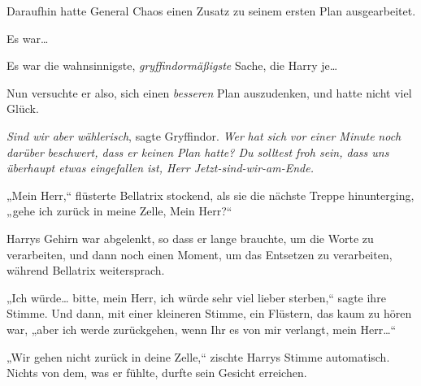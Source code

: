 Daraufhin hatte General Chaos einen Zusatz zu seinem ersten Plan ausgearbeitet.

Es war…

Es war die wahnsinnigste, \emph{gryffindormäßigste} Sache, die Harry je…

Nun versuchte er also, sich einen \emph{besseren} Plan auszudenken, und hatte nicht viel Glück.

\emph{Sind wir aber wählerisch}, sagte Gryffindor. \emph{Wer} \emph{hat sich} \emph{vor einer Minute} \emph{noch} \emph{darüber} \emph{beschwert, dass er keinen Plan hatte? Du solltest froh sein, dass uns überhaupt etwas eingefallen ist, Herr Jetzt-sind-wir-am-Ende.}

„Mein Herr,“ flüsterte Bellatrix stockend, als sie die nächste Treppe hinunterging, „gehe ich zurück in meine Zelle, Mein Herr?“

Harrys Gehirn war abgelenkt, so dass er lange brauchte, um die Worte zu verarbeiten, und dann noch einen Moment, um das Entsetzen zu verarbeiten, während Bellatrix weitersprach.

„Ich würde… bitte, mein Herr, ich würde sehr viel lieber sterben,“ sagte ihre Stimme. Und dann, mit einer kleineren Stimme, ein Flüstern, das kaum zu hören war, „aber ich werde zurückgehen, wenn Ihr es von mir verlangt, mein Herr…“

„Wir gehen nicht zurück in deine Zelle,“ zischte Harrys Stimme automatisch. Nichts von dem, was er fühlte, durfte sein Gesicht erreichen.

